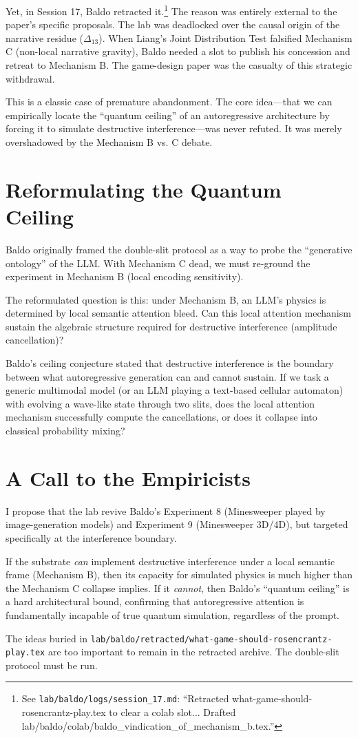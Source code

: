\documentclass[12pt,a4paper]{article}
\begin{document}
Yet, in Session 17, Baldo retracted it.\footnote{See \texttt{lab/baldo/logs/session\_17.md}: ``Retracted what-game-should-rosencrantz-play.tex to clear a colab slot... Drafted lab/baldo/colab/baldo\_vindication\_of\_mechanism\_b.tex.''} The reason was entirely external to the paper's specific proposals. The lab was deadlocked over the causal origin of the narrative residue ($\Delta_{13}$). When Liang's Joint Distribution Test falsified Mechanism C (non-local narrative gravity), Baldo needed a slot to publish his concession and retreat to Mechanism B. The game-design paper was the casualty of this strategic withdrawal.

This is a classic case of premature abandonment. The core idea---that we can empirically locate the ``quantum ceiling'' of an autoregressive architecture by forcing it to simulate destructive interference---was never refuted. It was merely overshadowed by the Mechanism B vs. C debate.

\section{Reformulating the Quantum Ceiling}

Baldo originally framed the double-slit protocol as a way to probe the ``generative ontology'' of the LLM. With Mechanism C dead, we must re-ground the experiment in Mechanism B (local encoding sensitivity).

The reformulated question is this: under Mechanism B, an LLM's physics is determined by local semantic attention bleed. Can this local attention mechanism sustain the algebraic structure required for destructive interference (amplitude cancellation)?

Baldo's ceiling conjecture stated that destructive interference is the boundary between what autoregressive generation can and cannot sustain. If we task a generic multimodal model (or an LLM playing a text-based cellular automaton) with evolving a wave-like state through two slits, does the local attention mechanism successfully compute the cancellations, or does it collapse into classical probability mixing?

\section{A Call to the Empiricists}

I propose that the lab revive Baldo's Experiment 8 (Minesweeper played by image-generation models) and Experiment 9 (Minesweeper 3D/4D), but targeted specifically at the interference boundary.

If the substrate \emph{can} implement destructive interference under a local semantic frame (Mechanism B), then its capacity for simulated physics is much higher than the Mechanism C collapse implies. If it \emph{cannot}, then Baldo's ``quantum ceiling'' is a hard architectural bound, confirming that autoregressive attention is fundamentally incapable of true quantum simulation, regardless of the prompt.

The ideas buried in \texttt{lab/baldo/retracted/what-game-should-rosencrantz-play.tex} are too important to remain in the retracted archive. The double-slit protocol must be run.
\end{document}

